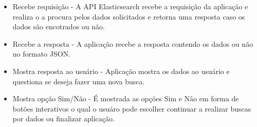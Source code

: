\begin{itemize}
	\item Recebe requisição - A API Elasticsearch recebe a requisição da aplicação e realiza o a procura pelos dados solicitados e retorna uma resposta caso os dados são encotrados ou não.
	\item Recebe a resposta - A aplicação recebe a resposta contendo os dados ou não no formato JSON.
	\item Mostra resposta ao usuário - Aplicação mostra os dados ao usuário e questiona se deseja fazer uma nova busca.
	\item Mostra opção Sim/Não - É mostrada as opções Sim e Nâo em forma de botões interativos o qual o usuáro pode escolher continuar a realizar buscas por dados ou finalizar aplicação.
\end{itemize}
